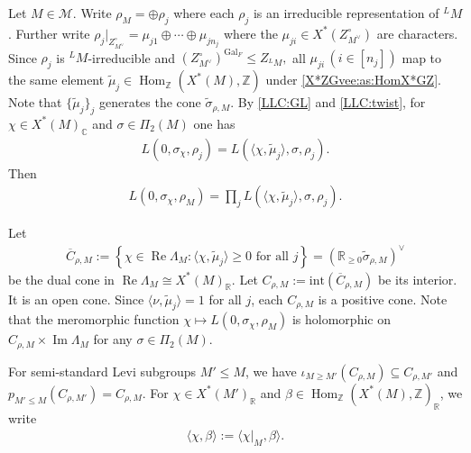 \documentclass[10pt]{amsart}
\theoremstyle{definition}
\numberwithin{equation}{section}
\DeclareMathOperator{\Hom}{\mathrm{Hom}}
\DeclareMathOperator{\Gal}{\mathrm{Gal}}
\numberwithin{equation}{subsection}
\newcommand{\ZZ}{\mathbb{Z}}
\newcommand{\RR}{\mathbb{R}}
\renewcommand{\Im}{\mathop{\mathrm{Im}}}
\renewcommand{\Re}{\mathop{\mathrm{Re}}}
\begin{document}
 Let $M\in \mathcal{M}$. Write $\rho_{M} = \oplus \rho_j$ where each $\rho_j$ is an irreducible representation of $^LM$. Further write $\rho_j\vert_{Z_{M^\vee}^\circ} = \mu_{j1}\oplus\cdots\oplus\mu_{jn_j}$ where the $\mu_{ji}\in X^*(Z^\circ_{M^\vee})$ are characters. Since $\rho_j$ is $^LM$-irreducible and $(Z^\circ_{M^\vee})^{\Gal_F}\le  Z_{{}^LM},$ all $\mu_{ji}\,(i\in[n_j])$ map to the same element $\widetilde{\mu}_j\in\Hom_\mathbb{Z}(X^*(M),\mathbb{Z})$ under \eqref{X*ZGvee:as:HomX*GZ}. Note that $\{\widetilde{\mu}_j\}_{j}$ generates the cone $\widetilde{\sigma}_{\rho,M}$. By \eqref{LLC:GL} and \eqref{LLC:twist}, for $\chi\in X^*(M)_{\mathbb{C}}$ and $\sigma\in \Pi_2(M)$ one has
\begin{align*}
L(0,\sigma_\chi,\rho_j) = L(\langle\chi,\widetilde{\mu}_j\rangle,\sigma,\rho_j).
\end{align*}
Then 
\begin{align}\label{Lfactor:factorize}
    L(0,\sigma_\chi,\rho_{M}) = \prod_{j}L( \langle\chi,\widetilde{\mu}_j\rangle,\sigma,\rho_j).
\end{align}

Let
\begin{align}\label{CrhoM:dualcone:defn}
    \overline{C}_{\rho,M} := \left\{\chi\in \Re \Lambda_M: \langle\chi,\widetilde{\mu}_j\rangle \ge  0 \textrm{ for all } j\right\} = \left(\RR_{\ge 0}\widetilde{\sigma}_{\rho,M}\right)^\vee
\end{align} 
be the dual cone in $\Re\Lambda_M\cong X^\ast(M)_\RR.$ Let $C_{\rho,M}:=\mathrm{int}(\overline{C}_{\rho,M})$ be its interior. It is an open cone. Since $\langle \nu,\widetilde{\mu}_j\rangle=1$ for all $j$, each $C_{\rho,M}$ is a positive cone. Note that the meromorphic function $\chi\mapsto L(0,\sigma_{\chi}, \rho_{M})$ is holomorphic on $C_{\rho,M}\times \Im \Lambda_M$ for any $\sigma\in \Pi_2(M)$. 

For semi-standard Levi subgroups $M'\leq M$, we have $\iota_{M\ge M'}(C_{\rho,M})\subseteq C_{\rho,M'}$ and $p_{M'\le M}(C_{\rho,M'})=C_{\rho,M}.$ For $\chi\in X^*(M')_\RR$ and $\beta\in\Hom_\ZZ(X^*(M),\ZZ)_\RR$, we write
\begin{align}\label{pairing:bw:Levis}
    \langle \chi,\beta\rangle := \langle \chi|_{M},\beta\rangle.
\end{align}
\end{document}
